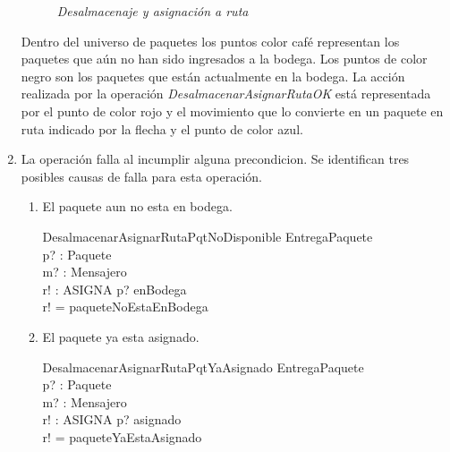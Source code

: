\documentclass[12pt,a4paper]{article}
\begin{document}
\begin{enumerate}
\begin{figure}[H]
\caption{\textit{Desalmacenaje y asignación a ruta}} \label{fig:M1}
\end{figure}

Dentro del universo de paquetes los puntos color café representan los paquetes que aún no han sido ingresados a la bodega. Los puntos de color negro son los paquetes que están actualmente en la bodega. La acción realizada por la operación \textit{DesalmacenarAsignarRutaOK} está representada por el punto de color rojo y el movimiento que lo convierte en un paquete en ruta indicado por la flecha y el punto de color azul.

\item La operación falla al incumplir alguna precondicion. Se identifican tres posibles causas de falla para esta operación.

\begin{enumerate}
\item El paquete aun no esta en bodega.
\begin{schema}{DesalmacenarAsignarRutaPqtNoDisponible}
\Xi EntregaPaquete\\
p? : Paquete\\
m? : Mensajero\\
r! : ASIGNA
\where
p? \notin enBodega\\
r! = paqueteNoEstaEnBodega
\end{schema}

\item El paquete ya esta asignado.
\begin{schema}{DesalmacenarAsignarRutaPqtYaAsignado}
\Xi EntregaPaquete\\
p? : Paquete\\
m? : Mensajero\\
r! : ASIGNA
\where
p? \in  \dom asignado\\
r! = paqueteYaEstaAsignado
\end{schema}


\end{enumerate}
\end{enumerate}
\end{document}
